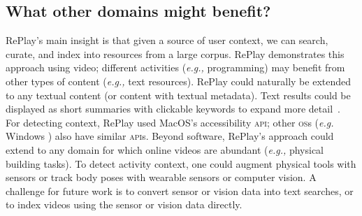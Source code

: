\subsection{What other domains might benefit?}
RePlay's main insight is that given a source of user context, we can search, curate, and index into resources from a large corpus. RePlay demonstrates this approach using video; different activities (\textit{e.g.,} programming) may benefit from other types of content (\textit{e.g.,} text resources). RePlay could naturally be extended to any textual content (or content with textual metadata). Text results could be displayed as short summaries with clickable keywords to expand more detail~\cite{Ekstrand2011}. For detecting context, RePlay used Mac\-OS's accessibility \textsc{api}; other \textsc{os}s (\textit{e.g.} Windows \cite{Matejka2013}) also have similar \textsc{api}s. %
Beyond software, RePlay's approach could extend to any domain for which online videos are abundant (\textit{e.g.,} physical building tasks). To detect activity context, one could augment physical tools with sensors \cite{Schoop2016, Lukowicz2004} or track body poses with wearable sensors or computer vision. A challenge for future work is to convert sensor or vision data into text searches, or to index videos using the sensor or vision data directly. 




